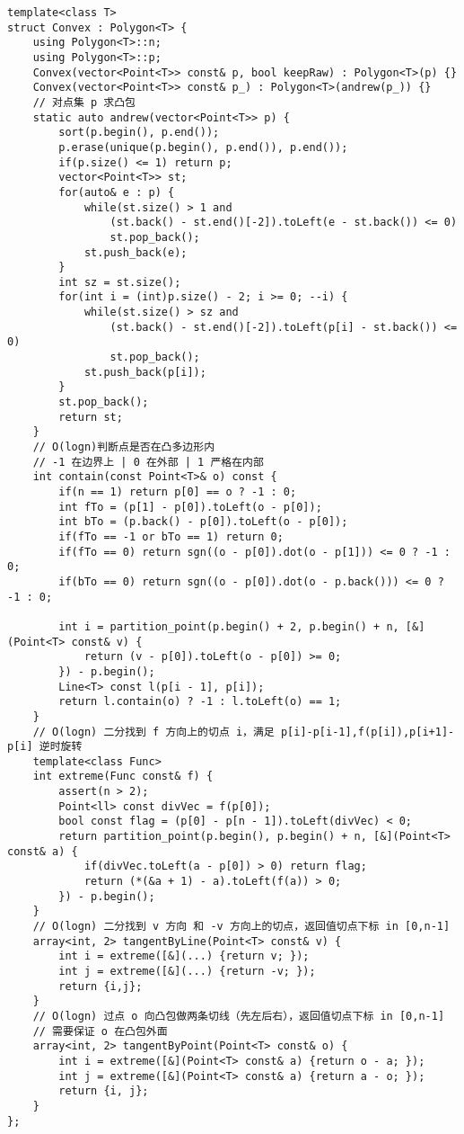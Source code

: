 \begin{lstlisting}
template<class T>
struct Convex : Polygon<T> {
    using Polygon<T>::n;
    using Polygon<T>::p;
    Convex(vector<Point<T>> const& p, bool keepRaw) : Polygon<T>(p) {}
    Convex(vector<Point<T>> const& p_) : Polygon<T>(andrew(p_)) {}
    // 对点集 p 求凸包
    static auto andrew(vector<Point<T>> p) {
        sort(p.begin(), p.end());
        p.erase(unique(p.begin(), p.end()), p.end());
        if(p.size() <= 1) return p;
        vector<Point<T>> st;
        for(auto& e : p) {
            while(st.size() > 1 and
                (st.back() - st.end()[-2]).toLeft(e - st.back()) <= 0)
                st.pop_back();
            st.push_back(e);
        }
        int sz = st.size();
        for(int i = (int)p.size() - 2; i >= 0; --i) {
            while(st.size() > sz and
                (st.back() - st.end()[-2]).toLeft(p[i] - st.back()) <= 0)
                st.pop_back();
            st.push_back(p[i]);
        }
        st.pop_back();
        return st;
    }
    // O(logn)判断点是否在凸多边形内
    // -1 在边界上 | 0 在外部 | 1 严格在内部
    int contain(const Point<T>& o) const {
        if(n == 1) return p[0] == o ? -1 : 0;
        int fTo = (p[1] - p[0]).toLeft(o - p[0]);
        int bTo = (p.back() - p[0]).toLeft(o - p[0]);
        if(fTo == -1 or bTo == 1) return 0;
        if(fTo == 0) return sgn((o - p[0]).dot(o - p[1])) <= 0 ? -1 : 0;
        if(bTo == 0) return sgn((o - p[0]).dot(o - p.back())) <= 0 ? -1 : 0;

        int i = partition_point(p.begin() + 2, p.begin() + n, [&](Point<T> const& v) {
            return (v - p[0]).toLeft(o - p[0]) >= 0;
        }) - p.begin();
        Line<T> const l(p[i - 1], p[i]);
        return l.contain(o) ? -1 : l.toLeft(o) == 1;
    }
    // O(logn) 二分找到 f 方向上的切点 i，满足 p[i]-p[i-1],f(p[i]),p[i+1]-p[i] 逆时旋转
    template<class Func>
    int extreme(Func const& f) {
        assert(n > 2);
        Point<ll> const divVec = f(p[0]);
        bool const flag = (p[0] - p[n - 1]).toLeft(divVec) < 0;
        return partition_point(p.begin(), p.begin() + n, [&](Point<T> const& a) {
            if(divVec.toLeft(a - p[0]) > 0) return flag;
            return (*(&a + 1) - a).toLeft(f(a)) > 0;
        }) - p.begin();
    }
    // O(logn) 二分找到 v 方向 和 -v 方向上的切点，返回值切点下标 in [0,n-1]
    array<int, 2> tangentByLine(Point<T> const& v) {
        int i = extreme([&](...) {return v; });
        int j = extreme([&](...) {return -v; });
        return {i,j};
    }
    // O(logn) 过点 o 向凸包做两条切线（先左后右），返回值切点下标 in [0,n-1]
    // 需要保证 o 在凸包外面
    array<int, 2> tangentByPoint(Point<T> const& o) {
        int i = extreme([&](Point<T> const& a) {return o - a; });
        int j = extreme([&](Point<T> const& a) {return a - o; });
        return {i, j};
    }
};
\end{lstlisting}

